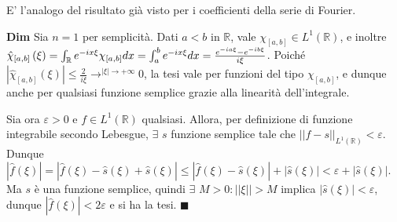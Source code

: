 \documentclass{article}
\begin{document}
E' l'analogo del risultato gi\`{a} visto per i coefficienti della serie di
Fourier.

\textbf{Dim} Sia $n=1$ per semplicit\`{a}. Dati $a<b$ in $%
\mathbb{R}
$, vale $\chi _{\left[ a,b\right] }\in L^{1}\left( 
\mathbb{R}
\right) $, e inoltre $\hat{\chi}_{\left[ a,b\right] }\left( \xi \right)
=\int_{%
\mathbb{R}
}e^{-ix\xi }\chi _{\left[ a,b\right] }dx=\int_{a}^{b}e^{-ix\xi }dx=\frac{%
e^{-ia\xi }-e^{-ib\xi }}{i\xi }$. Poich\'{e} $\left\vert \hat{\chi}_{\left[
a,b\right] }\left( \xi \right) \right\vert \leq \frac{2}{i\xi }\rightarrow
^{\left\vert \xi \right\vert \rightarrow +\infty }0$, la tesi vale per
funzioni del tipo $\chi _{\left[ a,b\right] }$, e dunque anche per qualsiasi
funzione semplice grazie alla linearit\`{a} dell'integrale.

Sia ora $\varepsilon >0$ e $f\in L^{1}\left( 
\mathbb{R}
\right) $ qualsiasi. Allora, per definizione di funzione integrabile secondo
Lebesgue, $\exists $ $s$ funzione semplice tale che $\left\vert \left\vert
f-s\right\vert \right\vert _{L^{1}\left( 
\mathbb{R}
\right) }<\varepsilon $. Dunque $\left\vert \hat{f}\left( \xi \right)
\right\vert =\left\vert \hat{f}\left( \xi \right) -\hat{s}\left( \xi \right)
+\hat{s}\left( \xi \right) \right\vert \leq \left\vert \hat{f}\left( \xi
\right) -\hat{s}\left( \xi \right) \right\vert +\left\vert \hat{s}\left( \xi
\right) \right\vert <\varepsilon +\left\vert \hat{s}\left( \xi \right)
\right\vert $. Ma $s$ \`{e} una funzione semplice, quindi $\exists $ $%
M>0:\left\vert \left\vert \xi \right\vert \right\vert >M$ implica $%
\left\vert \hat{s}\left( \xi \right) \right\vert <\varepsilon $, dunque $%
\left\vert \hat{f}\left( \xi \right) \right\vert <2\varepsilon $ e si ha la
tesi. $\blacksquare $
\end{document}
